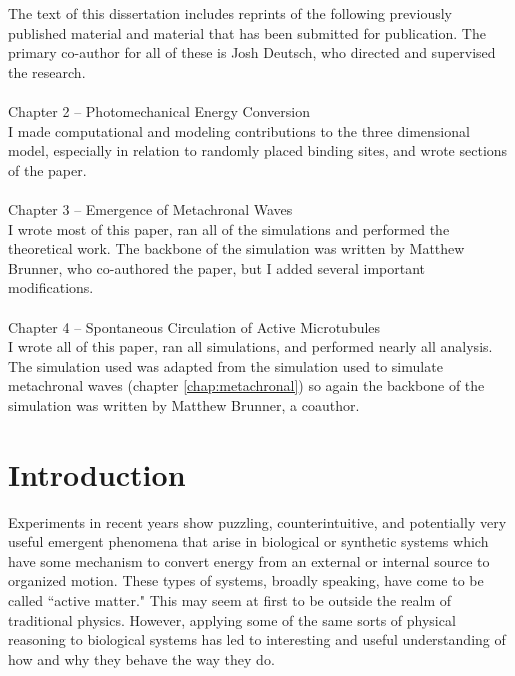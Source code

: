 \documentclass[11pt]{ucthesis}
\begin{document}
\begin{frontmatter}
\begin{acknowledgements}
The text of this dissertation includes
reprints of the following previously published material and material that has been submitted for publication. The primary co-author for all of these is Josh Deutsch, who directed and supervised the research.\\ \\
Chapter 2 -- Photomechanical Energy Conversion \cite{deutsch2015photomechanical}\\
I made computational and modeling contributions to the three dimensional model, especially in relation to randomly placed binding sites, and wrote sections of the paper.\\ \\
Chapter 3 -- Emergence of Metachronal Waves \cite{martin2018emergence}\\
I wrote most of this paper, ran all of the simulations and performed the theoretical work. The backbone of the simulation was written by Matthew Brunner, who co-authored the paper, but I added several important modifications. \\ \\
Chapter 4 -- Spontaneous Circulation of Active Microtubules \cite{martin2018spontaneous}\\
I wrote all of this paper, ran all simulations, and performed nearly all analysis. The simulation used was adapted from the simulation used to simulate metachronal waves (chapter \ref{chap:metachronal}) so again the backbone of the simulation was written by Matthew Brunner, a coauthor.
\end{acknowledgements}

\end{frontmatter}

\chapter{Introduction}

Experiments in recent years show puzzling, counterintuitive, and potentially very useful emergent phenomena that arise in biological or synthetic systems which have some mechanism to convert energy from an external or internal source to organized motion. These types of systems, broadly speaking, have come to be called ``active matter." This may seem at first to be outside the realm of traditional physics. However, applying some of the same sorts of physical reasoning to biological systems has led to interesting and useful understanding of how and why they behave the way they do.
\end{document}
